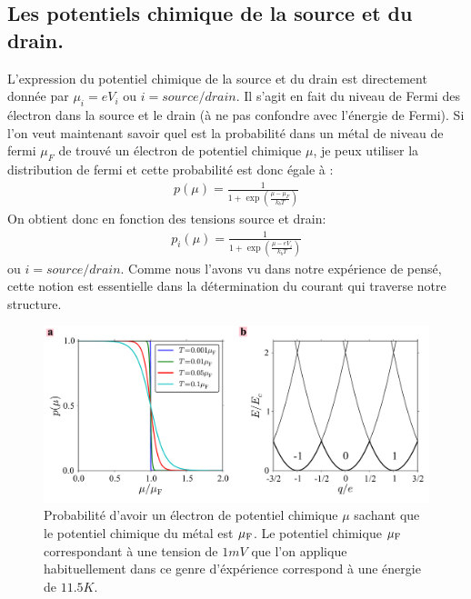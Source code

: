 \subsection{Les potentiels chimique de la source et du drain.}
L'expression du potentiel chimique de la source et du drain est directement donnée par $\mu_i = e V_i$ ou $i=source/drain$. Il s'agit en fait du niveau de Fermi des électron dans la source et le drain (à ne pas confondre avec l'énergie de Fermi). Si l'on veut maintenant savoir quel est la probabilité dans un métal de niveau de fermi $\mu_F$ de trouvé un électron de potentiel chimique $\mu$, je peux utiliser la distribution de fermi et cette probabilité est donc égale à :
\begin{eqnarray}
p(\mu) = \frac{1}{1 + \exp{(\frac{\mu - \mu_F}{k_bT})}} \nonumber
\end{eqnarray}
 On obtient donc en fonction des tensions source et drain:
\begin{eqnarray}
p_i(\mu) = \frac{1}{1 + \exp{(\frac{\mu - eV_i}{k_bT})}}
\end{eqnarray}
ou $i=source/drain$. Comme nous l'avons vu dans notre expérience de pensé, cette notion est essentielle dans la détermination du courant qui traverse notre structure.

\begin{figure}
\centering \includegraphics[scale=0.5]{Theorie/Transport/figure2/figure2.pdf} 
\caption{Probabilité d'avoir un électron de potentiel chimique $\mu$ sachant que le potentiel chimique du métal est $\mu_{\rm{F}}$. Le potentiel chimique $\mu_{\rm{F}}$ correspondant à une tension de $1mV$ que l'on applique habituellement dans ce genre d'éxpérience correspond à une énergie de $11.5K$.}
\label{distrib_fermi}
\end{figure}



